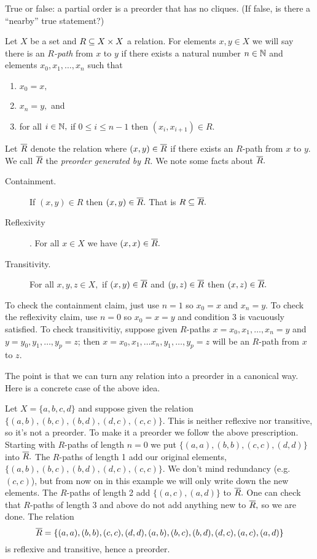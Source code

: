 \documentclass[../main/CT4S-EN-RU]{subfiles}
\begin{document}
\begin{exerciseENG}
True or false: a partial order is a preorder that has no cliques. (If false, is there a “nearby” true statement?)
\end{exerciseENG}

\begin{exerciseRUS}
\end{exerciseRUS}

\begin{exampleENG}\label{ex:preorder generated}
Let $X$ be a set and $R\ss X\times X$ a relation. For elements $x,y\in X$ we will say there is an {\em $R$-path} from $x$ to $y$ if there exists a natural number $n\in\NN$ and elements $x_0,x_1,\ldots,x_n$ such that
\begin{enumerate}
\item $x_0=x,$
\item $x_n=y,$ and
\item for all $i\in\NN,$ if $0\leq i\leq n-1$ then $(x_i,x_{i+1})\in R.$
\end{enumerate}
Let $\ol{R}$ denote the relation where $(x,y)\in\ol{R}$ if there exists an $R$-path from $x$ to $y.$ We call $\ol{R}$ the {\em preorder generated by $R.$} We note some facts about $\ol{R}.$
\begin{description}
\item[Containment.] If $(x,y)\in R$ then $(x,y)\in\ol{R}.$ That is $R\ss\ol{R}.$
\item[Reflexivity]. For all $x\in X$ we have $(x,x)\in\ol{R}.$ 
\item[Transitivity.] For all $x,y,z\in X,$ if $(x,y)\in\ol{R}$ and $(y,z)\in\ol{R}$ then $(x,z)\in\ol{R}.$
\end{description}
To check the containment claim, just use $n=1$ so $x_0=x$ and $x_n=y.$ To check the reflexivity claim, use $n=0$ so $x_0=x=y$ and condition 3 is vacuously satisfied. To check transitivitiy, suppose given $R$-paths $x=x_0,x_1,\ldots,x_n=y$ and $y=y_0,y_1,\ldots,y_p=z$; then $x=x_0,x_1,\ldots x_n,y_1,\ldots,y_p=z$ will be an $R$-path from $x$ to $z.$

The point is that we can turn any relation into a preorder in a canonical way. Here is a concrete case of the above idea.

Let $X=\{a,b,c,d\}$ and suppose given the relation $\{(a,b),(b,c),(b,d),(d,c),(c,c)\}.$ This is neither reflexive nor transitive, so it's not a preorder. To make it a preorder we follow the above prescription. Starting with $R$-paths of length $n=0$ we put  $\{(a,a), (b,b), (c,c), (d,d)\}$ into $\ol{R}.$ The $R$-paths of length 1 add our original elements, $\{(a,b),(b,c),(b,d),(d,c),(c,c)\}.$ We don't mind redundancy (e.g. $(c,c)$), but from now on in this example we will only write down the new elements. The $R$-paths of length 2 add $\{(a,c),(a,d)\}$ to $\ol{R}.$ One can check that $R$-paths of length 3 and above do not add anything new to $\ol{R},$ so we are done. The relation $$\ol{R}=\{(a,a), (b,b), (c,c), (d,d), (a,b), (b,c), (b,d), (d,c), (a,c), (a,d)\}$$ is reflexive and transitive, hence a preorder.
\end{exampleENG}
\end{document}
